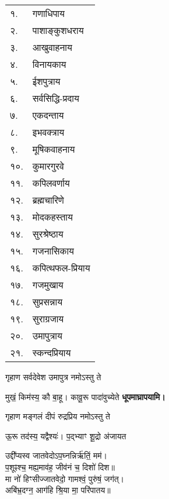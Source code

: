\begin{center}
\begin{longtable}{ll@{~नमः — दूर्वायुग्मं समर्पयामि।}}
    १. & गणाधिपाय \\
    २. & पाशाङ्कुशधराय \\
    ३. & आखुवाहनाय \\
    ४. & विनायकाय \\
    ५. & ईशपुत्राय \\
    ६. & सर्वसिद्धि-प्रदाय \\
    ७. & एकदन्ताय \\
    ८. & इभवक्त्राय \\
    ९. & मूषिकवाहनाय \\
    १०. & कुमारगुरवे \\
    ११. & कपिलवर्णाय \\
    १२. & ब्रह्मचारिणे \\
    १३. & मोदकहस्ताय \\
    १४. & सुरश्रेष्ठाय \\
    १५. & गजनासिकाय \\
    १६. & कपित्थफल-प्रियाय \\
    १७. & गजमुखाय \\
    १८. & सुप्रसन्नाय \\
    १९. & सुराग्रजाय \\
    २०. & उमापुत्राय \\
    २१. & स्कन्दप्रियाय \\
\end{longtable}

\needspace{3em}
\begingroup
\setlength{\columnseprule}{1pt}
\let\chapt\sect


\endgroup

{गृहाण सर्वदेवेश उमापुत्र नमोऽस्तु ते} 

{मुखं॒ किम॑स्य॒ कौ बा॒हू। कावू॒रू पादा॑वुच्येते}
\textbf{\devAya{} धूपमाघ्रापयामि।}
\medskip

{गृहाण मङ्गलं दीपं रुद्रप्रिय नमोऽस्तु ते}

{ऊ॒रू तद॑स्य॒ यद्वैश्यः॑। प॒द्भ्याꣳ शू॒द्रो अ॑जायत}

उद्दी᳚प्यस्व जातवेदोऽप॒घ्नन्निर्ऋ॑तिं॒ मम॑।\\
प॒शूꣴश्च॒ मह्य॒माव॑ह॒ जीव॑नं च॒ दिशो॑ दिश॥\\
मा नो॑ हिꣳसीज्जातवेदो॒ गामश्वं॒ पुरु॑षं॒ जग॑त्।\\
अबि॑भ्र॒दग्न॒ आग॑हि श्रि॒या मा॒ परि॑पातय॥ \\


\end{center}
